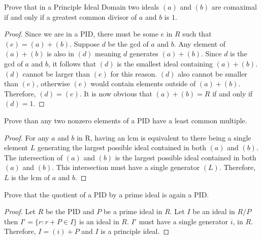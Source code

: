 \documentclass[10pt]{article}
\newenvironment{problem}[2][Problem]{\begin{trivlist}
		\item[\hskip \labelsep {\bfseries #1}\hskip \labelsep {\bfseries #2.}]}{\end{trivlist}}
\begin{document}
	\begin{problem}{2.1}
		Prove that in a Principle Ideal Domain two ideals $(a)$ and $(b)$ are comaximal if and only if a greatest common divisor of $a$ and $b$ is $1$.
		\begin{proof}
			 Since we are in a PID, there must be some $e$ in $R$ such that $(e) = (a) + (b)$. Suppose $d$ be the gcd of $a$ and $b$. Any element of $(a) + (b)$ is also in $(d)$ meaning $d$ generates $(a) + (b)$. Since $d$ is the gcd of $a$ and $b$, it follows that $(d)$ is the smallest ideal containing $(a) + (b)$. $(d)$ cannot be larger than $(e)$ for this reason. $(d)$ also cannot be smaller than $(e)$, otherwise $(e)$ would contain elements outside of $(a) + (b)$. Therefore, $(d) = (e)$. It is now obvious that $(a) + (b) = R$ if and only if $(d) = 1$. 
		\end{proof}
	\end{problem}
	
	\begin{problem}{2.2}
		Prove than any two nonzero elements of a PID have a least common multiple.
		\begin{proof}
			For any $a$ and $b$ in R, having an lcm is equivalent to there being a single element $L$ generating the largest possible ideal contained in both $(a)$ and $(b)$. The intersection of $(a)$ and $(b)$ is the largest possible ideal contained in both $(a)$ and $(b)$. This intersection must have a single generator $(L)$. Therefore, $L$ is the lcm of $a$ and $b$. 
		\end{proof}
	\end{problem}
	
	\begin{problem}{2.3}
		Prove that the quotient of a PID by a prime ideal is again a PID.
		\begin{proof}
			Let $R$ be the PID and $P$ be a prime ideal in $R$. Let $I$ be an ideal in $R/P$ then $I' = \{r : r + P \in I\}$ is an ideal in $R$. $I'$ must have a single generator $i$, in $R$. Therefore, $I = (i) + P$ and $I$ is a principle ideal. 
		\end{proof}
	\end{problem}
	
\end{document}
